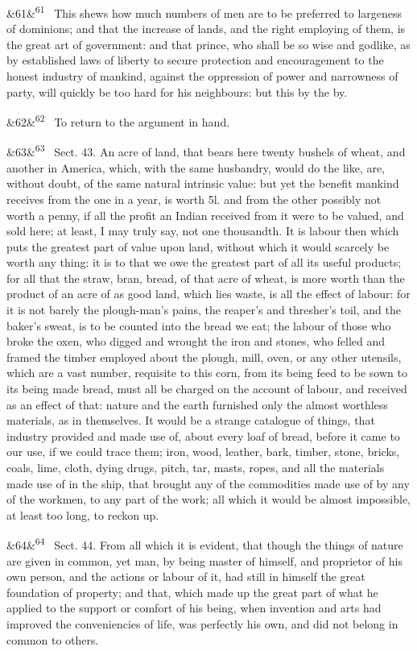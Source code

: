 \documentclass[12pt]{article}
\newcommand{\para}[1][]{\par\noindent\ifx&#1&\else\textsuperscript{\footnotesize #1}~\fi}
\begin{document}
\para[61] This shews how much numbers of men are to be preferred to largeness of dominions; and that the increase of lands, and the right employing of them, is the great art of government: and that prince, who shall be so wise and godlike, as by established laws of liberty to secure protection and encouragement to the honest industry of mankind, against the oppression of power and narrowness of party, will quickly be too hard for his neighbours: but this by the by.

\para[62] To return to the argument in hand.

\para[63] Sect. 43. An acre of land, that bears here twenty bushels of wheat, and another in America, which, with the same husbandry, would do the like, are, without doubt, of the same natural intrinsic value: but yet the benefit mankind receives from the one in a year, is worth 5l. and from the other possibly not worth a penny, if all the profit an Indian received from it were to be valued, and sold here; at least, I may truly say, not one thousandth. It is labour then which puts the greatest part of value upon land, without which it would scarcely be worth any thing: it is to that we owe the greatest part of all its useful products; for all that the straw, bran, bread, of that acre of wheat, is more worth than the product of an acre of as good land, which lies waste, is all the effect of labour: for it is not barely the plough-man's pains, the reaper's and thresher's toil, and the baker's sweat, is to be counted into the bread we eat; the labour of those who broke the oxen, who digged and wrought the iron and stones, who felled and framed the timber employed about the plough, mill, oven, or any other utensils, which are a vast number, requisite to this corn, from its being feed to be sown to its being made bread, must all be charged on the account of labour, and received as an effect of that: nature and the earth furnished only the almost worthless materials, as in themselves. It would be a strange catalogue of things, that industry provided and made use of, about every loaf of bread, before it came to our use, if we could trace them; iron, wood, leather, bark, timber, stone, bricks, coals, lime, cloth, dying drugs, pitch, tar, masts, ropes, and all the materials made use of in the ship, that brought any of the commodities made use of by any of the workmen, to any part of the work; all which it would be almost impossible, at least too long, to reckon up.

\para[64] Sect. 44. From all which it is evident, that though the things of nature are given in common, yet man, by being master of himself, and proprietor of his own person, and the actions or labour of it, had still in himself the great foundation of property; and that, which made up the great part of what he applied to the support or comfort of his being, when invention and arts had improved the conveniencies of life, was perfectly his own, and did not belong in common to others.
\end{document}
